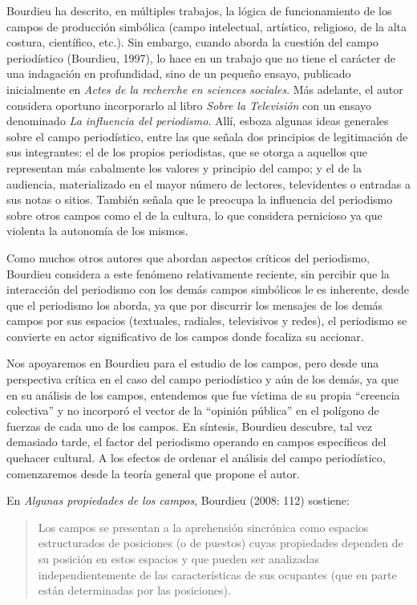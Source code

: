 Bourdieu ha descrito, en múltiples trabajos, la lógica de funcionamiento de los campos de producción simbólica (campo intelectual, artístico, religioso, de la alta costura, científico, etc.). Sin embargo, cuando  aborda la cuestión del campo periodístico (Bourdieu, 1997), lo hace en un trabajo que no tiene el carácter de una indagación en profundidad, sino de un pequeño ensayo, publicado inicialmente en \emph{Actes de la recherche en sciences sociales}. Más adelante, el autor considera oportuno incorporarlo al libro \emph{Sobre la Televisión} con un ensayo denominado \emph{La influencia del periodismo}. Allí, esboza algunas ideas generales sobre el campo periodístico, entre las que señala dos principios de legitimación de sus integrantes: el de los propios periodistas, que se otorga a aquellos que representan más cabalmente los valores y principio del campo; y el de la audiencia, materializado en el mayor número de lectores, televidentes o entradas a sus notas o sitios. También señala que le preocupa la influencia del periodismo sobre otros campos como el de la cultura, lo que considera pernicioso ya que violenta la autonomía de los mismos.

Como muchos otros autores que abordan aspectos críticos del periodismo, Bourdieu considera a este fenómeno relativamente reciente, sin percibir que la interacción del periodismo con los demás campos simbólicos le es inherente, desde que el periodismo los aborda, ya que por discurrir los mensajes de los demás campos por sus espacios (textuales, radiales, televisivos y redes), el periodismo se convierte en actor significativo de los campos donde focaliza su accionar.

Nos apoyaremos en Bourdieu para el estudio de los campos, pero desde una perspectiva crítica en el caso del campo periodístico y aún de los demás, ya que en su análisis de los campos, entendemos que fue víctima de su propia ``creencia colectiva'' y no incorporó el vector de la ``opinión pública'' en el polígono de fuerzas de cada uno de los campos. En síntesis, Bourdieu descubre, tal vez demasiado tarde, el factor del periodismo operando en campos específicos del quehacer cultural. A los efectos de ordenar el análisis del campo periodístico, comenzaremos desde la teoría general que propone el autor.

En \emph{Algunas propiedades de los campos}, Bourdieu (2008: 112) sostiene:

\begin{quote}
Los campos se presentan a la aprehensión sincrónica como espacios estructurados de posiciones (o de puestos) cuyas propiedades dependen de su posición en estos espacios y que pueden ser analizadas independientemente de las características de sus ocupantes (que en parte están determinadas por las posiciones).
\end{quote}

